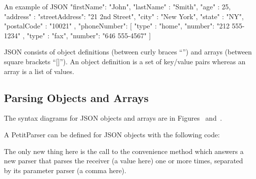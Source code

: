 \documentclass[a4paper,10pt,twoside]{book}
\begin{document}
\begin{script}{An example of JSON}
{
  "firstName": "John",
  "lastName" : "Smith",
  "age"      : 25,
  "address"  :
  {
    "streetAddress": "21 2nd Street",
    "city"         : "New York",
    "state"        : "NY",
    "postalCode"   : "10021"
  },
  "phoneNumber":
  [
    {
      "type"  : "home",
      "number": "212 555-1234"
    },
    {
      "type"  : "fax",
      "number": "646 555-4567"
    }
  ]
}
\end{script}

JSON consists of object definitions (between curly braces ``{}'') and
arrays (between square brackets ``[]''). An object definition is a set
of key/value pairs whereas an array is a list of values.

\subsection{Parsing Objects and Arrays}


The syntax diagrams for JSON objects and arrays are in
Figures~ and~.

A PetitParser can be defined for JSON objects with the following code:


The only new thing here is the call to the 
convenience method which answers a new parser that parses the receiver
(a value here) one or more times, separated by its parameter parser (a
comma here).
\end{document}
